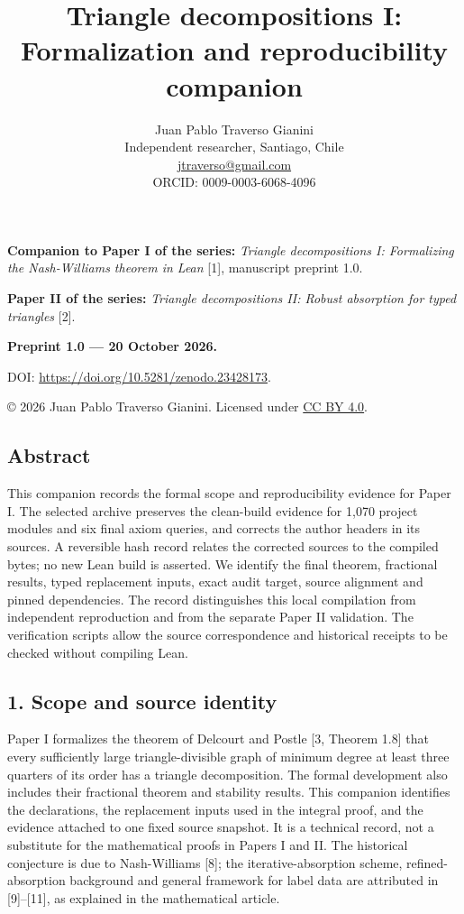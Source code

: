 \documentclass[english,11pt,a4paper]{article}
\title{Triangle decompositions I: Formalization and reproducibility companion}
\author{Juan Pablo Traverso Gianini\\
\small Independent researcher, Santiago, Chile\\
\small \href{mailto:jtraverso@gmail.com}{jtraverso@gmail.com}\\
\small ORCID: 0009-0003-6068-4096}
\date{}
\begin{document}
\raggedbottom
\maketitle
\textbf{Companion to Paper I of the series:} \emph{Triangle decompositions I: Formalizing the Nash-Williams theorem in Lean} {[}1{]}, manuscript preprint 1.0.

\textbf{Paper II of the series:} \emph{Triangle decompositions II: Robust absorption for typed triangles} {[}2{]}.

\textbf{Preprint 1.0 --- 20 October 2026.}

DOI: \url{https://doi.org/10.5281/zenodo.23428173}.

© 2026 Juan Pablo Traverso Gianini. Licensed under \href{https://creativecommons.org/licenses/by/4.0/}{CC BY 4.0}.

\subsection{Abstract}\label{abstract}

This companion records the formal scope and reproducibility evidence for Paper I. The selected archive preserves the clean-build evidence for 1,070 project modules and six final axiom queries, and corrects the author headers in its sources. A reversible hash record relates the corrected sources to the compiled bytes; no new Lean build is asserted. We identify the final theorem, fractional results, typed replacement inputs, exact audit target, source alignment and pinned dependencies. The record distinguishes this local compilation from independent reproduction and from the separate Paper II validation. The verification scripts allow the source correspondence and historical receipts to be checked without compiling Lean.

\subsection{1. Scope and source identity}\label{scope-and-source-identity}

Paper I formalizes the theorem of Delcourt and Postle {[}3, Theorem 1.8{]} that every sufficiently large triangle-divisible graph of minimum degree at least three quarters of its order has a triangle decomposition. The formal development also includes their fractional theorem and stability results. This companion identifies the declarations, the replacement inputs used in the integral proof, and the evidence attached to one fixed source snapshot. It is a technical record, not a substitute for the mathematical proofs in Papers I and II. The historical conjecture is due to Nash-Williams {[}8{]}; the iterative-absorption scheme, refined-absorption background and general framework for label data are attributed in {[}9{]}--{[}11{]}, as explained in the mathematical article.
\end{document}
